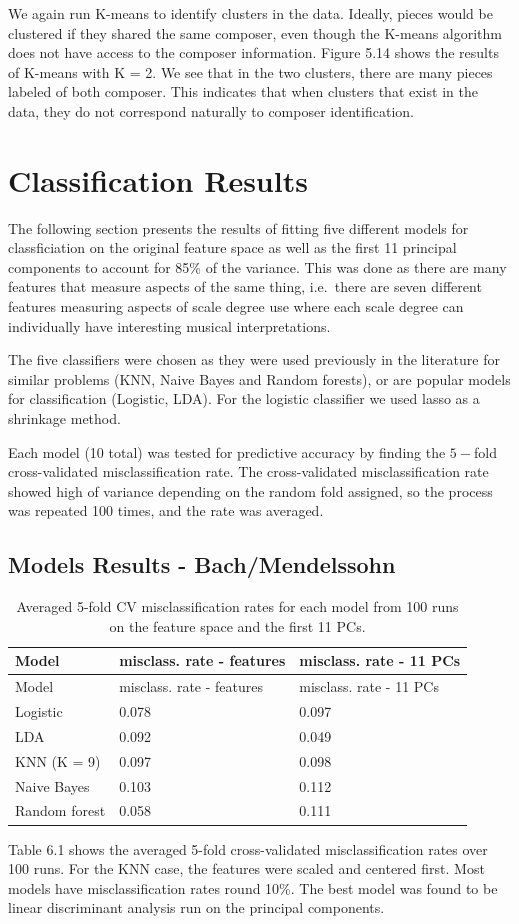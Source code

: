 \documentclass[12pt,twoside]{reedthesis}
\theoremstyle{definition}
\theoremstyle{definition}
\theoremstyle{definition}
\theoremstyle{remark}
\begin{document}
We again run K-means to identify clusters in the data. Ideally, pieces
would be clustered if they shared the same composer, even though the
K-means algorithm does not have access to the composer information.
Figure 5.14 shows the results of K-means with K = 2. We see that in the
two clusters, there are many pieces labeled of both composer. This
indicates that when clusters that exist in the data, they do not
correspond naturally to composer identification.

\chapter{Classification Results}\label{classification-results}

The following section presents the results of fitting five different
models for classficiation on the original feature space as well as the
first 11 principal components to account for 85\% of the variance. This
was done as there are many features that measure aspects of the same
thing, i.e.~there are seven different features measuring aspects of
scale degree use where each scale degree can individually have
interesting musical interpretations.

The five classifiers were chosen as they were used previously in the
literature for similar problems (KNN, Naive Bayes and Random forests),
or are popular models for classification (Logistic, LDA). For the
logistic classifier we used lasso as a shrinkage method.

Each model (10 total) was tested for predictive accuracy by finding the
\(5-\)fold cross-validated misclassification rate. The cross-validated
misclassification rate showed high of variance depending on the random
fold assigned, so the process was repeated 100 times, and the rate was
averaged.

\section{Models Results -
Bach/Mendelssohn}\label{models-results---bachmendelssohn}
\begin{longtable}[]{@{}lll@{}}
\caption{Averaged 5-fold CV misclassification rates for each model from
100 runs on the feature space and the first 11 PCs.}\tabularnewline
\toprule
Model & misclass. rate - features & misclass. rate - 11
PCs\tabularnewline
\midrule
\endfirsthead
\toprule
Model & misclass. rate - features & misclass. rate - 11
PCs\tabularnewline
\midrule
\endhead
Logistic & 0.078 & 0.097\tabularnewline
LDA & 0.092 & 0.049\tabularnewline
KNN (K = 9) & 0.097 & 0.098\tabularnewline
Naive Bayes & 0.103 & 0.112\tabularnewline
Random forest & 0.058 & 0.111\tabularnewline
\bottomrule
\end{longtable}
Table 6.1 shows the averaged 5-fold cross-validated misclassification
rates over 100 runs. For the KNN case, the features were scaled and
centered first. Most models have misclassification rates round 10\%. The
best model was found to be linear discriminant analysis run on the
principal components.
\end{document}
